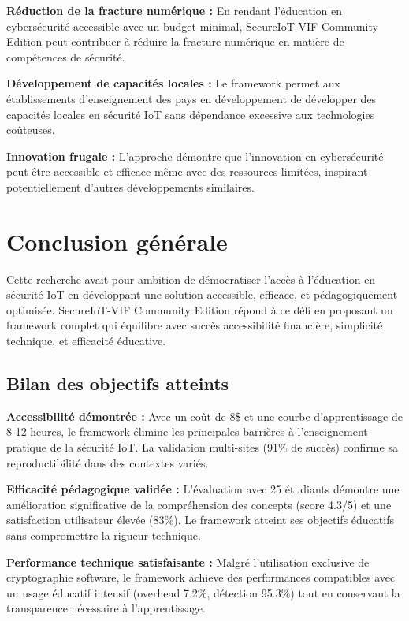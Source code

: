 \textbf{Réduction de la fracture numérique :} En rendant l'éducation en cybersécurité accessible avec un budget minimal, SecureIoT-VIF Community Edition peut contribuer à réduire la fracture numérique en matière de compétences de sécurité.

\textbf{Développement de capacités locales :} Le framework permet aux établissements d'enseignement des pays en développement de développer des capacités locales en sécurité IoT sans dépendance excessive aux technologies coûteuses.

\textbf{Innovation frugale :} L'approche démontre que l'innovation en cybersécurité peut être accessible et efficace même avec des ressources limitées, inspirant potentiellement d'autres développements similaires.

\section{Conclusion générale}

Cette recherche avait pour ambition de démocratiser l'accès à l'éducation en sécurité IoT en développant une solution accessible, efficace, et pédagogiquement optimisée. SecureIoT-VIF Community Edition répond à ce défi en proposant un framework complet qui équilibre avec succès accessibilité financière, simplicité technique, et efficacité éducative.

\subsection{Bilan des objectifs atteints}

\textbf{Accessibilité démontrée :} Avec un coût de 8\$ et une courbe d'apprentissage de 8-12 heures, le framework élimine les principales barrières à l'enseignement pratique de la sécurité IoT. La validation multi-sites (91\% de succès) confirme sa reproductibilité dans des contextes variés.

\textbf{Efficacité pédagogique validée :} L'évaluation avec 25 étudiants démontre une amélioration significative de la compréhension des concepts (score 4.3/5) et une satisfaction utilisateur élevée (83\%). Le framework atteint ses objectifs éducatifs sans compromettre la rigueur technique.

\textbf{Performance technique satisfaisante :} Malgré l'utilisation exclusive de cryptographie software, le framework achieve des performances compatibles avec un usage éducatif intensif (overhead 7.2\%, détection 95.3\%) tout en conservant la transparence nécessaire à l'apprentissage.

